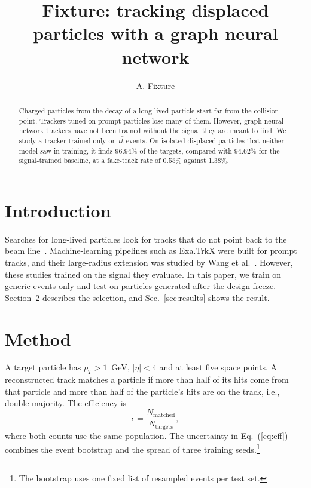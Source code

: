 \documentclass[aps,prd,twocolumn,superscriptaddress,nofootinbib]{revtex4-2}
\newcommand{\ttbar}{\ensuremath{t\bar{t}}}
\begin{document}
\title{Fixture: tracking displaced particles with a graph neural network}
\author{A. Fixture}

\begin{abstract}
Charged particles from the decay of a long-lived particle start far from the collision point.
Trackers tuned on prompt particles lose many of them.
However, graph-neural-network trackers have not been trained without the signal they are meant to find.
We study a tracker trained only on \ttbar{} events.
On isolated displaced particles that neither model saw in training, it finds 96.94\% of the targets, compared with 94.62\% for the signal-trained baseline, at a fake-track rate of 0.55\% against 1.38\%.
\end{abstract}

\maketitle

\section{Introduction}
\label{sec:intro}
Searches for long-lived particles look for tracks that do not point back to the beam line~\cite{Ju2022Zenodo}.
Machine-learning pipelines such as Exa.TrkX were built for prompt tracks, and their large-radius extension was studied by Wang et al.~\cite{Wang2022LRT}.
However, these studies trained on the signal they evaluate.
In this paper, we train on generic events only and test on particles generated after the design freeze.
Section~\ref{sec:method} describes the selection, and Sec.~\ref{sec:results} shows the result.

\section{Method}
\label{sec:method}
A target particle has $p_T > 1$~GeV, $|\eta| < 4$ and at least five space points.
A reconstructed track matches a particle if more than half of its hits come from that particle and more than half of the particle's hits are on the track, i.e., double majority.
The efficiency is
\begin{equation}
  \epsilon = \frac{N_{\text{matched}}}{N_{\text{targets}}},
  \label{eq:eff}
\end{equation}
where both counts use the same population.
The uncertainty in Eq.~(\ref{eq:eff}) combines the event bootstrap and the spread of three training seeds.\footnote{The bootstrap uses one fixed list of resampled events per test set.}
\end{document}
